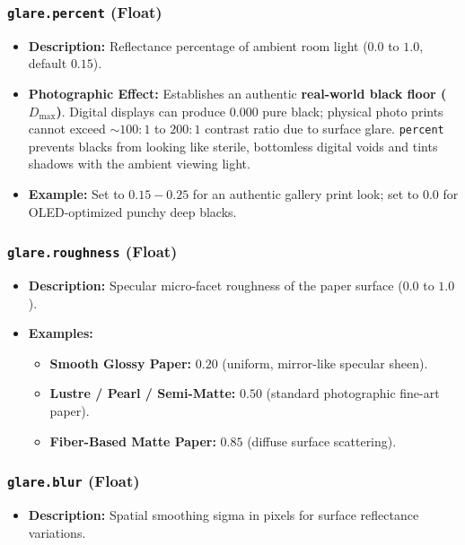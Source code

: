 \documentclass[11pt,a4paper]{article}
\begin{document}
\subsubsection{\texttt{glare.percent} (Float)}
\begin{itemize}[leftmargin=*]
    \item \textbf{Description:} Reflectance percentage of ambient room light ($0.0$ to $1.0$, default $0.15$).
    \item \textbf{Photographic Effect:} Establishes an authentic \textbf{real-world black floor ($D_{\max}$)}. Digital displays can produce $0.000$ pure black; physical photo prints cannot exceed $\sim 100:1$ to $200:1$ contrast ratio due to surface glare. \texttt{percent} prevents blacks from looking like sterile, bottomless digital voids and tints shadows with the ambient viewing light.
    \item \textbf{Example:} Set to $0.15 - 0.25$ for an authentic gallery print look; set to $0.0$ for OLED-optimized punchy deep blacks.
\end{itemize}

\subsubsection{\texttt{glare.roughness} (Float)}
\begin{itemize}[leftmargin=*]
    \item \textbf{Description:} Specular micro-facet roughness of the paper surface ($0.0$ to $1.0$).
    \item \textbf{Examples:}
    \begin{itemize}
        \item \textbf{Smooth Glossy Paper:} $0.20$ (uniform, mirror-like specular sheen).
        \item \textbf{Lustre / Pearl / Semi-Matte:} $0.50$ (standard photographic fine-art paper).
        \item \textbf{Fiber-Based Matte Paper:} $0.85$ (diffuse surface scattering).
    \end{itemize}
\end{itemize}

\subsubsection{\texttt{glare.blur} (Float)}
\begin{itemize}[leftmargin=*]
    \item \textbf{Description:} Spatial smoothing sigma in pixels for surface reflectance variations.
\end{itemize}
\end{document}
